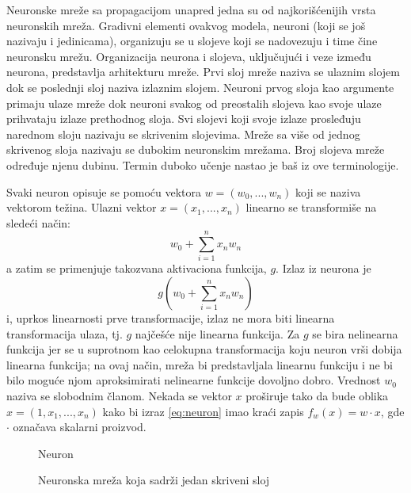 Neuronske mreže sa propagacijom unapred jedna su od najkorišćenijih vrsta neuronskih mreža. Gradivni elementi ovakvog modela, neuroni (koji se još nazivaju i jedinicama), organizuju se u slojeve koji se nadovezuju i time čine neuronsku mrežu. Organizacija neurona i slojeva, uključujući i veze između neurona, predstavlja arhitekturu mreže. Prvi sloj mreže naziva se ulaznim slojem dok se poslednji sloj naziva izlaznim slojem. Neuroni prvog sloja kao argumente primaju ulaze mreže dok neuroni svakog od preostalih slojeva kao svoje ulaze prihvataju izlaze prethodnog sloja. Svi slojevi koji svoje izlaze prosleđuju narednom sloju nazivaju se skrivenim slojevima. Mreže sa više od jednog skrivenog sloja nazivaju se dubokim neuronskim mrežama.  Broj slojeva mreže određuje njenu dubinu. Termin duboko učenje nastao je baš iz ove terminologije.
\par
Svaki neuron opisuje se pomoću vektora $w = (w_0, ..., w_n)$ koji se naziva vektorom težina. Ulazni vektor $x = (x_1, ..., x_n)$ linearno se transformiše na sledeći način:
\begin{equation}
\label{eq:neuron}
		w_0 + \sum_{i=1}^{n} x_nw_n 
\end{equation}
a zatim se primenjuje takozvana aktivaciona funkcija, $g$. Izlaz iz neurona je 
\begin{equation}
	g(w_0 + \sum_{i=1}^{n} x_nw_n)
\end{equation}
i, uprkos linearnosti prve transformacije, izlaz ne mora biti linearna transformacija ulaza, tj. $g$ najčešće nije linearna funkcija. Za $g$ se bira nelinearna funkcija jer se u suprotnom kao celokupna transformacija koju neuron vrši dobija linearna funkcija; na ovaj način, mreža bi predstavljala linearnu funkciju i ne bi bilo moguće njom aproksimirati nelinearne funkcije dovoljno dobro. Vrednost $w_0$ naziva se slobodnim članom. Nekada se vektor $x$ proširuje tako da bude oblika $x = (1, x_1, ..., x_n)$ kako bi izraz \eqref{eq:neuron} imao kraći zapis $f_w(x) = w \cdot x$, gde $\cdot$ označava skalarni proizvod.\\

\begin{figure}
	\centering
	\resizebox{.5\linewidth}{!}{}
	\caption{Neuron}
	\label{fig:neuron}
\end{figure}

\begin{figure}
	\centering
	\resizebox{.5\linewidth}{!}{}
	\caption{Neuronska mreža koja sadrži jedan skriveni sloj}
	\label{fig:mreza}
\end{figure}

